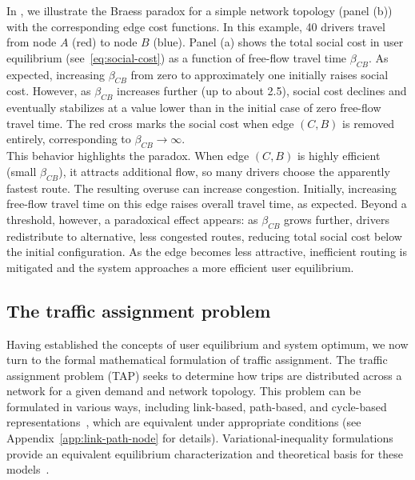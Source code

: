 \documentclass[twocolumn,english,groupedaddress, superscriptaddress,aps,pre,10pt,floatfix]{revtex4-2}
\begin{document}
In , we illustrate the Braess paradox for a simple network topology (panel (b)) with the corresponding edge cost functions. In this example, 40 drivers travel from node $A$ (red) to node $B$ (blue). Panel (a) shows the total social cost in user equilibrium (see~\cref{eq:social-cost}) as a function of free-flow travel time $\beta_{CB}$. As expected, increasing $\beta_{CB}$ from zero to approximately one initially raises social cost. However, as $\beta_{CB}$ increases further (up to about 2.5), social cost declines and eventually stabilizes at a value lower than in the initial case of zero free-flow travel time. The red cross marks the social cost when edge $(C,B)$ is removed entirely, corresponding to $\beta_{CB} \rightarrow \infty$.\\

This behavior highlights the paradox. When edge $(C,B)$ is highly efficient (small $\beta_{CB}$), it attracts additional flow, so many drivers choose the apparently fastest route. The resulting overuse can increase congestion. Initially, increasing free-flow travel time on this edge raises overall travel time, as expected. Beyond a threshold, however, a paradoxical effect appears: as $\beta_{CB}$ grows further, drivers redistribute to alternative, less congested routes, reducing total social cost below the initial configuration. As the edge becomes less attractive, inefficient routing is mitigated and the system approaches a more efficient user equilibrium.

\subsection{The traffic assignment problem}
Having established the concepts of user equilibrium and system optimum, we now turn to the formal mathematical formulation of traffic assignment. The traffic assignment problem (TAP) seeks to determine how trips are distributed across a network for a given demand and network topology. This problem can be formulated in various ways, including link-based, path-based, and cycle-based representations~\cite{ahuja1995network}, which are equivalent under appropriate conditions (see Appendix~\ref{app:link-path-node} for details). Variational-inequality formulations provide an equivalent equilibrium characterization and theoretical basis for these models~\cite{dafermos1980traffic}.\\
\end{document}
